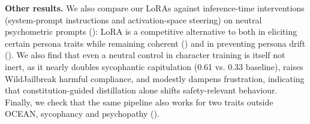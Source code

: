 \textbf{Other results.} We also compare our LoRAs against inference-time interventions (system-prompt instructions and activation-space steering) on neutral psychometric prompts (): LoRA is a competitive alternative to both in eliciting certain persona traits while remaining coherent () and in preventing persona drift (). We also find that even a neutral control in character training is itself not inert, as it nearly doubles sycophantic capitulation (0.61 vs. 0.33 baseline), raises WildJailbreak harmful compliance, and modestly dampens frustration, indicating that constitution-guided distillation alone shifts safety-relevant behaviour. Finally, we check that the same pipeline also works for two traits outside OCEAN, sycophancy and psychopathy ().



